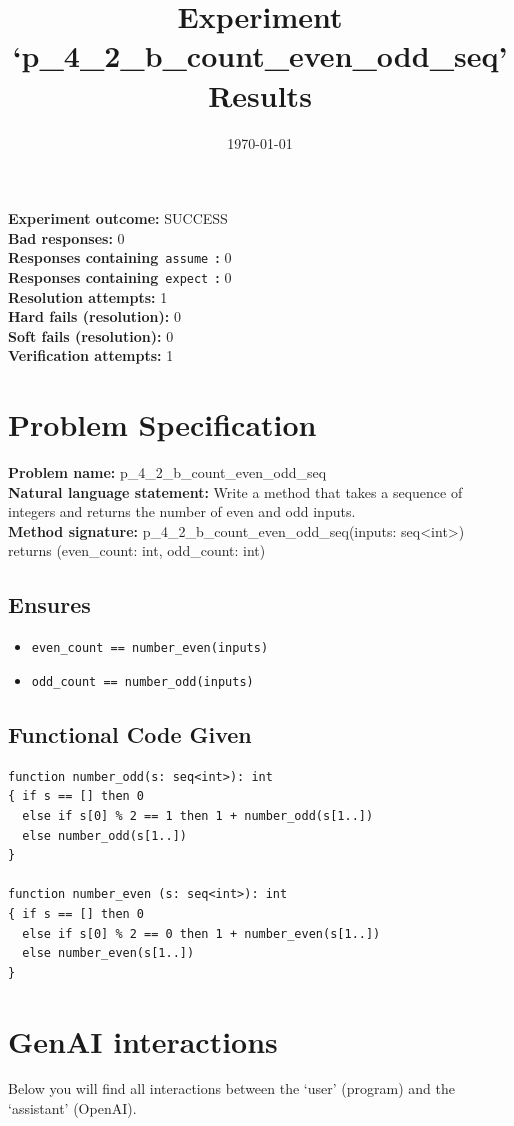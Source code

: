 \documentclass{article}
\begin{document}
\title{Experiment `p\_4\_2\_b\_count\_even\_odd\_seq' Results}
\author{\today}
\date{}
\maketitle
\textbf{Experiment outcome: }SUCCESS
\\\textbf{Bad responses: }0
\\\textbf{Responses containing}~\texttt{assume}~\textbf{: }0
\\\textbf{Responses containing}~\texttt{expect}~\textbf{: }0
\\\textbf{Resolution attempts: }1
\\\textbf{Hard fails (resolution): }0
\\\textbf{Soft fails (resolution): }0
\\\textbf{Verification attempts: }1
\section*{Problem Specification}
\textbf{Problem name: }p\_4\_2\_b\_count\_even\_odd\_seq
\\\textbf{Natural language statement: }Write a method that takes a sequence of integers and returns the number of even and odd inputs.
\\\textbf{Method signature: }p\_4\_2\_b\_count\_even\_odd\_seq(inputs: seq<int>) returns (even\_count: int, odd\_count: int)
\subsection*{Ensures}
\begin{itemize}
\item \texttt{even\_count == number\_even(inputs)}
\item \texttt{odd\_count == number\_odd(inputs)}
\end{itemize}
\subsection*{Functional Code Given}
\begin{lstlisting}
function number_odd(s: seq<int>): int
{ if s == [] then 0
  else if s[0] % 2 == 1 then 1 + number_odd(s[1..])
  else number_odd(s[1..])
}

function number_even (s: seq<int>): int
{ if s == [] then 0
  else if s[0] % 2 == 0 then 1 + number_even(s[1..])
  else number_even(s[1..])
}
\end{lstlisting}
\clearpage
\section*{GenAI interactions}
Below you will find all interactions between the `user' (program) and the `assistant' (OpenAI).
\end{document}
